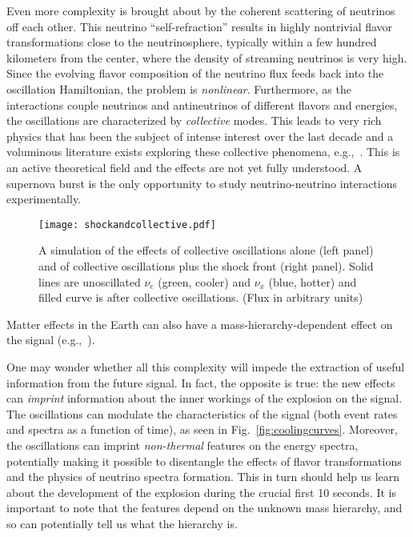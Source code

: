 Even more complexity is brought about by the coherent scattering of neutrinos off each other. This neutrino ``self-refraction'' 
 results in highly nontrivial flavor transformations close to the neutrinosphere, typically within a few hundred kilometers from the center, where the density of streaming neutrinos is very high. Since the evolving flavor composition of the neutrino flux feeds back into the oscillation Hamiltonian, the problem is \emph{nonlinear}. Furthermore, as the interactions couple neutrinos and antineutrinos of different flavors and energies, the oscillations are characterized by \emph{collective} modes.    This leads to very rich physics that has been the subject of intense interest over the last decade and a voluminous literature exists exploring these collective phenomena,
e.g.,~\cite{Duan:2005cp,Fogli:2007bk,Raffelt:2007cb,Raffelt:2007xt,EstebanPretel:2008ni,Duan:2009cd,Dasgupta:2009mg,Duan:2010bg,Duan:2010bf,Wu:2014kaa}.  This is an active theoretical field and the effects are not yet fully understood. A supernova burst is the only opportunity to study neutrino-neutrino interactions experimentally.

\begin{figure}[!htb]
\centering
\texttt{[image: shockandcollective.pdf]}
\caption[Simulated cooling curves from the Garching light progenitor model]{ A simulation of the effects of collective oscillations alone (left panel) and of collective oscillations plus the shock front (right panel). Solid lines are unoscillated $\nu_e$ (green, cooler) and $\nu_x$ (blue, hotter) and filled curve is after collective oscillations. (Flux in arbitrary units)}
\label{fig:shockandcollective}
\end{figure}

Matter effects in the Earth can also have a mass-hierarchy-dependent effect on the signal (e.g.,~\cite{Choubey:2010up}).

One may wonder whether all this complexity will impede the extraction of useful information from the future signal. In fact, the opposite is true: the new effects can \emph{imprint} information about the inner workings of the explosion on the signal. The oscillations can modulate the characteristics of the signal (both event rates and spectra as a function of time), as seen in Fig.~\ref{fig:coolingcurves}. Moreover, the oscillations can imprint \emph{non-thermal} features on the energy spectra, potentially making it possible to disentangle the effects of flavor transformations and the physics of neutrino spectra formation. This in turn should help us learn about the development of the explosion during the crucial first 10 seconds.   It is important to note that the features depend on the unknown mass hierarchy, and so can potentially tell us what the hierarchy is.

